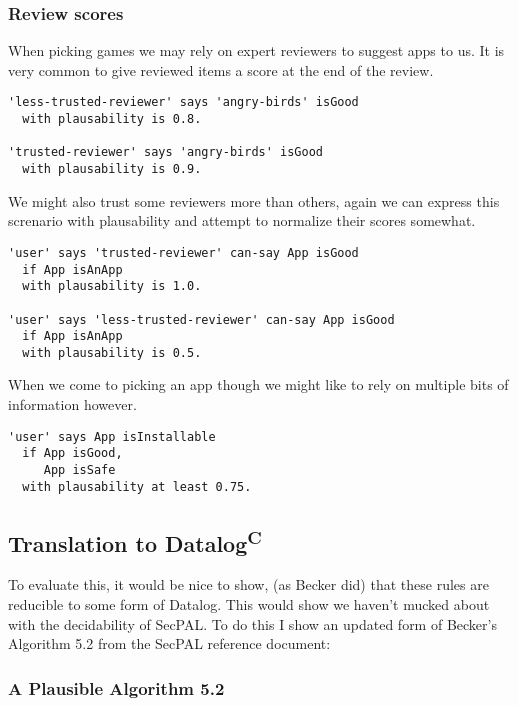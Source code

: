 \documentclass[thesis.tex]{subfiles}
\begin{document}
\subsubsection{Review scores}

When picking games we may rely on expert reviewers to suggest apps to
us.  It is very common to give reviewed items a score at the end of
the review.

\begin{lstlisting}
'less-trusted-reviewer' says 'angry-birds' isGood
  with plausability is 0.8.

'trusted-reviewer' says 'angry-birds' isGood
  with plausability is 0.9.
\end{lstlisting}

We might also trust some reviewers more than others, again we can
express this screnario with plausability and attempt to normalize
their scores somewhat.

\begin{lstlisting}
'user' says 'trusted-reviewer' can-say App isGood
  if App isAnApp
  with plausability is 1.0.

'user' says 'less-trusted-reviewer' can-say App isGood
  if App isAnApp
  with plausability is 0.5.
\end{lstlisting}

When we come to picking an app though we might like to rely on
multiple bits of information however.

\begin{lstlisting}
'user' says App isInstallable
  if App isGood,
     App isSafe
  with plausability at least 0.75.
\end{lstlisting}

\subsection{Translation to Datalog\textsuperscript{C}}

To evaluate this, it would be nice to show, (as Becker did) that these
rules are reducible to some form of Datalog.  This would show we
haven't mucked about with the decidability of SecPAL.  To do this I
show an updated form of Becker's Algorithm 5.2 from the SecPAL
reference document:

\subsubsection{A Plausible Algorithm 5.2}
\end{document}
